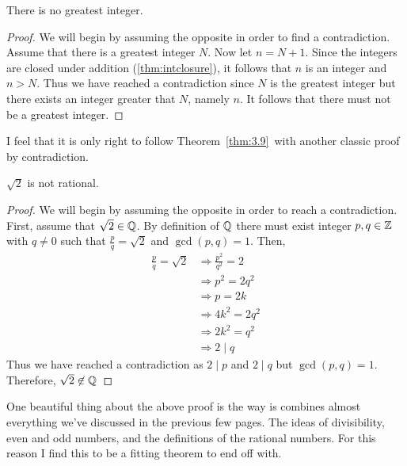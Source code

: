 \begin{thm}{}{\label{thm:3.9}}
    There is no greatest integer. 
    \begin{proof}
        We will begin by assuming the opposite in order to find a contradiction. Assume that there is a greatest integer $N$. Now let $n= N+1$. Since the integers are closed under addition (\ref{thm:intclosure}), it follows that $n$ is an integer and $n > N$. Thus we have reached a contradiction since $N$ is the greatest integer but there exists an integer greater that $N$, namely $n$. It follows that there must not be a greatest integer.
    \end{proof}
\end{thm}

I feel that it is only right to follow Theorem~\ref{thm:3.9}~with another classic proof by contradiction.

\begin{thm}{}
    $\sqrt{2}$ is not rational.
    \begin{proof}
        We will begin by assuming the opposite in order to reach a contradiction. First, assume that $\sqrt{2} \in \mathbb Q$. By definition of $\mathbb Q$ there must exist integer $p, q \in \mathbb Z$ with $q \ne 0$ such that $\frac{p}{q} = \sqrt{2}$ and $\gcd(p, q) = 1$. Then,
        \begin{align*}
            \frac{p}{q} = \sqrt{2} &\Rightarrow \frac{p^2}{q^2} = 2 \\
            &\Rightarrow p^2 = 2q^2 \\
            &\Rightarrow p = 2k \tag{since it's square is even} \\
            &\Rightarrow 4k^2 = 2q^2 \\
            &\Rightarrow 2k^2 = q^2 \\
            &\Rightarrow 2 \mid q
        \end{align*}
        Thus we have reached a contradiction as $2 \mid p$ and $2 \mid q$ but $\gcd(p, q) = 1$. Therefore, $\sqrt{2} \not\in \mathbb Q$ 
    \end{proof}
\end{thm}

One beautiful thing about the above proof is the way is combines almost everything we've discussed in the previous few pages. The ideas of divisibility, even and odd numbers, and the definitions of the rational numbers. For this reason I find this to be a fitting theorem to end off with.